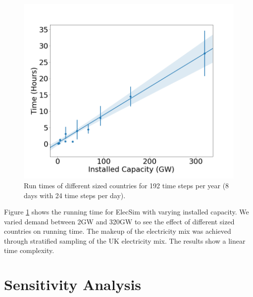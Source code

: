\begin{figure}[htbp]
	\centering
	\includegraphics[width=0.6\linewidth]{Chapter4/figures/timing_plot.png}
	\caption{Run times of different sized countries for 192 time steps per year (8 days with 24 time steps per day).}
	\label{fig:timingplot}
\end{figure}


Figure \ref{fig:timingplot} shows the running time for ElecSim with varying installed capacity. We varied demand between 2GW and 320GW to see the effect of different sized countries on running time. The makeup of the electricity mix was achieved through stratified sampling of the UK electricity mix. The results show a linear time complexity. 





\clearpage
\section{Sensitivity Analysis}
\label{elecsim:sec:sensitivity}

